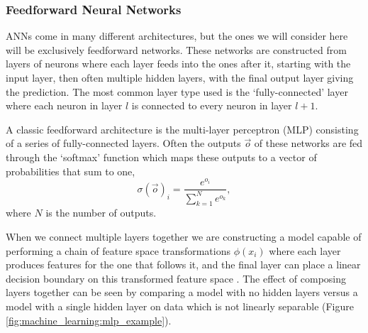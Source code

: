 \subsubsection{Feedforward Neural Networks}
ANNs come in many different architectures, but the ones we will consider here will be exclusively feedforward networks. 
These networks are constructed from layers of neurons where each layer feeds into the ones after it, starting with the input layer, then often multiple hidden layers, with the final output layer giving the prediction. 
The most common layer type used is the `fully-connected' layer where each neuron in layer $l$ is connected to every neuron in layer $l+1$. 

A classic feedforward architecture is the multi-layer perceptron (MLP) consisting of a series of fully-connected layers. Often the outputs $\vec{o}$ of these networks are fed through the `softmax' function which maps these outputs to a vector of probabilities that sum to one,
\begin{equation}
    \sigma(\vec{o})_{i} = \frac{e^{o_{i}}}{\sum_{k=1}^{N}e^{o_{k}}},
\end{equation}
where $N$ is the number of outputs. 

When we connect multiple layers together we are constructing a model capable of performing a chain of feature space transformations $\phi(x_{i})$ where each layer produces features for the one that follows it, and the final layer can place a linear decision boundary on this transformed feature space \cite{DeepLearningBook}. 
The effect of composing layers together can be seen by comparing a model with no hidden layers versus a model with a single hidden layer on data which is not linearly separable (Figure \ref{fig:machine_learning:mlp_example}).

